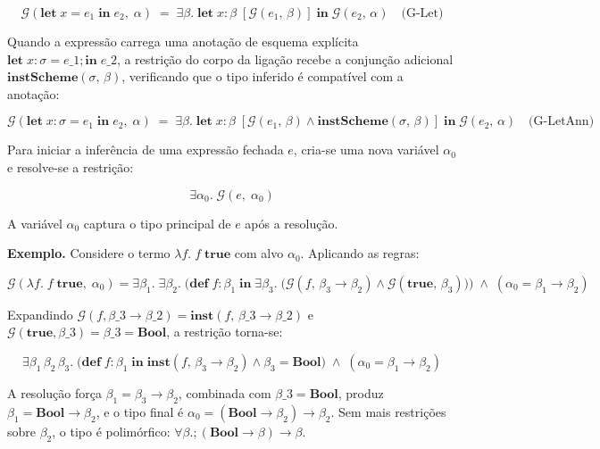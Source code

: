   \[ \mathcal{G}(\mathbf{let}\; x = e_1\; \mathbf{in}\; e_2,\; \alpha)
    \;=\; \exists \beta.\; \mathbf{let}\; x : \beta\; [\mathcal{G}(e_1,\,
  \beta)]\; \mathbf{in}\; \mathcal{G}(e_2,\, \alpha) \quad\text{(G-Let)} \]

  Quando a expressão carrega uma anotação de esquema explícita
  \(\mathbf{let}\; x : \sigma = e\_1;
  \mathbf{in}\; e\_2\), a restrição do corpo
  da ligação recebe a conjunção adicional
  \(\mathbf{instScheme}(\sigma,\, \beta)\), verificando que o tipo
  inferido é compatível com a anotação:

  \[ \mathcal{G}(\mathbf{let}\; x {:} \sigma = e_1\; \mathbf{in}\; e_2,\;
    \alpha) \;=\; \exists \beta.\; \mathbf{let}\; x : \beta\;
    [\mathcal{G}(e_1,\, \beta) \wedge \mathbf{instScheme}(\sigma,\, \beta)]\;
  \mathbf{in}\; \mathcal{G}(e_2,\, \alpha) \quad\text{(G-LetAnn)} \]

  Para iniciar a inferência de uma expressão fechada \(e\), cria-se uma
  nova variável \(\alpha_0\) e resolve-se a restrição:

  \[ \exists \alpha_0.\; \mathcal{G}(e,\; \alpha_0) \]

  A variável \(\alpha_0\) captura o tipo principal de \(e\) após a resolução.

  \textbf{Exemplo.} Considere o termo \(\lambda f.\; f\;
  \mathbf{true}\) com alvo \(\alpha_0\). Aplicando as regras:

  \[ \mathcal{G}(\lambda f.\; f\; \mathbf{true},\; \alpha_0) = \exists
    \beta_1.\; \exists \beta_2.\; \bigl(\mathbf{def}\; f : \beta_1\;
      \mathbf{in}\; \exists \beta_3.\; \bigl(\mathcal{G}(f,\, \beta_3
        \to \beta_2)
    \wedge \mathcal{G}(\mathbf{true},\, \beta_3)\bigr) \bigr) \;\wedge\;
  (\alpha_0 = \beta_1 \to \beta_2) \]

  Expandindo \(\mathcal{G}(f, \beta\_3 \to \beta\_2) =
  \mathbf{inst}(f,\, \beta\_3 \to \beta\_2)\)
  e \(\mathcal{G}(\mathbf{true}, \beta\_3) = \beta\_3 =
  \mathbf{Bool}\), a restrição torna-se:

  \[ \exists \beta_1\, \beta_2\, \beta_3.\; \bigl(\mathbf{def}\; f :
      \beta_1\; \mathbf{in}\; \mathbf{inst}(f,\, \beta_3 \to \beta_2) \wedge
  \beta_3 = \mathbf{Bool}\bigr) \;\wedge\; (\alpha_0 = \beta_1 \to \beta_2) \]

  A resolução força \(\beta_1 = \beta_3 \to \beta_2\), combinada com
  \(\beta\_3 = \mathbf{Bool}\), produz
  \(\beta_1 = \mathbf{Bool} \to \beta_2\), e o tipo final é \(\alpha_0
  = (\mathbf{Bool} \to \beta_2) \to \beta_2\). Sem mais restrições
  sobre \(\beta_2\), o tipo é polimórfico: \(\forall
  \beta.; (\mathbf{Bool} \to \beta) \to \beta\).

